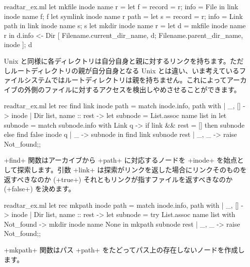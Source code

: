 \begin{answer}
\begin{listingcodefile}{readtar_ex.ml}
let mkfile inode name r =
  let f =  { record = r; info = File } in
  link inode name f; f
let symlink inode name r path =
  let s =  { record = r; info = Link path } in
  link inode name s; s
let mkdir inode name r =
  let d = mkfile inode name r in
  d.info <-
    Dir [ Filename.current_dir_name, d; Filename.parent_dir_name, inode ];
  d
\end{listingcodefile}
%
Unix と同様に各ディレクトリは自分自身と親に対するリンクを持ちます。ただしルートディレクトリの親が自分自身となる Unix とは違い、いま考えているファイルシステムではルートディレクトリは親を持ちません。これによってアーカイブの外側のファイルに対するアクセスを検出しやめさせることができます。
%
\begin{listingcodefile}{readtar_ex.ml}
let rec find link inode path = match inode.info, path with
  | _, [] -> inode
  | Dir list, name :: rest ->
      let subnode = List.assoc name list in
      let subnode =
        match subnode.info with
          Link q ->
            if link && rest = [] then subnode else find false inode q
        | _ -> subnode  in
      find link subnode rest
  | _, _ -> raise Not_found;;
\end{listingcodefile}
%
\ml+find+ 関数はアーカイブから \ml+path+ に対応するノードを \ml+inode+ を始点として探索します。引数 \ml+link+ は探索がリンクを返した場合にリンクそのものを返すべきなのか (\ml+true+) それともリンクが指すファイルを返すべきなのか (\ml+false+) を決めます。
%
\begin{listingcodefile}{readtar_ex.ml}
let rec mkpath inode path =
  match inode.info, path with
  | _, [] -> inode
  | Dir list, name :: rest ->
      let subnode =
        try List.assoc name list
        with Not_found ->  mkdir inode name None in
      mkpath subnode rest
  | _, _ -> raise Not_found;;
\end{listingcodefile}
%
\ml+mkpath+ 関数はパス \ml+path+ をたどってパス上の存在しないノードを作成します。

\end{answer}
